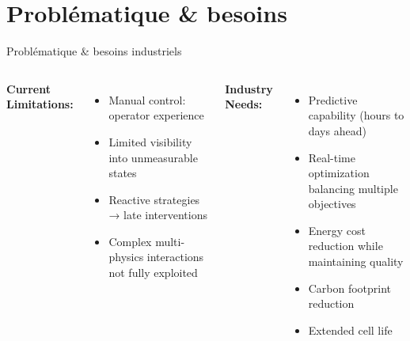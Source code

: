 \documentclass[aspectratio=169]{beamer}
\begin{document}
\section{Problématique \& besoins}

\begin{frame}{Problématique \& besoins industriels}
\begin{columns}[t]
\textbf{Current Limitations:}
\begin{itemize}
    \item \textcolor{accent2}{Manual control}: operator experience
    \item \textcolor{accent2}{Limited visibility} into unmeasurable states
    \item \textcolor{accent2}{Reactive strategies} → late interventions
    \item Complex multi-physics interactions not fully exploited
\end{itemize}

\textbf{Industry Needs:}
\begin{itemize}
    \item \textcolor{accent1}{Predictive capability} (hours to days ahead)
    \item \textcolor{accent1}{Real-time optimization} balancing multiple objectives
    \item \textcolor{accent1}{Energy cost reduction} while maintaining quality
    \item \textcolor{accent1}{Carbon footprint reduction}
    \item \textcolor{accent1}{Extended cell life}
\end{itemize}
\end{columns}
\end{frame}
\end{document}
